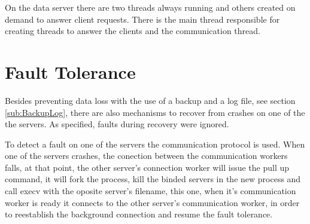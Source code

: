 \documentclass[12pt]{article} %
\begin{document}
On the data server there are two threads always running and others created
on demand to answer client requests. There is the main thread responsible for
creating threads to answer the clients and the communication thread.

\section{Fault Tolerance}
\label{sec:FaultTolerance}

Besides preventing data loss with the use of a backup and a log file, see section \ref{sub:BackupLog},
there are also mechanisms to recover from crashes on one of the the servers.
As specified, faults during recovery were ignored.

To detect a fault on one of the servers the communication protocol is used.
When one of the servers crashes, the conection between the communication
workers falls, at that point, the other server's connection worker will issue the pull
up command, it will fork the process, kill the binded servers in the new process and
call execv with the oposite server's filename, this one, when it's communication
worker is ready it connects to the other server's communication worker, in order
to reestablish the background connection and resume the fault tolerance.

\end{document}
